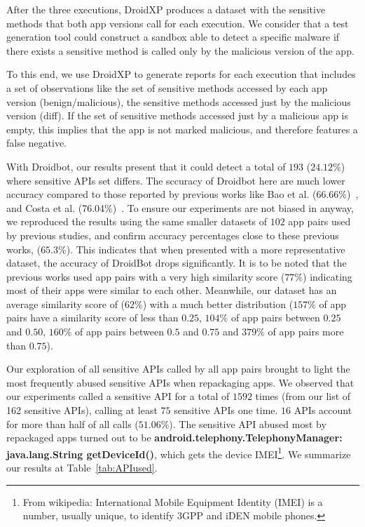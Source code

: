 After the three executions, DroidXP produces a dataset with the sensitive methods that both app versions call for each execution. We consider that a test generation tool could construct a sandbox able to detect a specific malware if there exists a sensitive method is called only by the malicious version of the app. 

To this end, we use DroidXP to generate reports for each execution that includes a set of observations like the set of sensitive methods accessed by each app version (benign/malicious), the sensitive methods accessed just by the malicious version (diff). If the set of sensitive methods accessed just by a malicious app is empty, this implies that the app is not marked malicious, and therefore features a false negative.

With Droidbot, our results present that it could detect a total of $193$ ($24.12$\%) where sensitive APIs set differs. The sccuracy of Droidbot here are much lower accuracy compared to those reported by previous works like Bao et al. (66.66\%)~\cite{DBLP:conf/wcre/BaoLL18}, and Costa et al. (76.04\%)~\cite{DBLP:journals/jss/CostaMMSSBNR22}. To ensure our experiments are not biased in anyway, we reproduced the results using the same smaller datasets of $102$ app pairs used by previous studies, and confirm accuracy percentages close to these previous works, ($65.3$\%). This indicates that when presented with a more representative dataset, the accuracy of DroidBot drops significantly. It is to be noted that the previous works used app pairs with a very high similarity score ($77\%$) indicating most of their apps were similar to each other. Meanwhile, our dataset has an average similarity score of ($62\%$) with a much better distribution ($157\%$ of app pairs have a similarity score of less than $0.25$, $104\%$ of app pairs between $0.25$ and $0.50$, $160\%$ of app pairs between $0.5$ and $0.75$  and $379\%$ of app pairs more than $0.75$). 

Our exploration of all sensitive APIs called by all app pairs brought to light the most frequently abused sensitive APIs when repackaging apps. We observed that our experiments called a sensitive API for a total of $1592$ times (from our list of 162 sensitive APIs), calling at least $75$ sensitive APIs one time. $16$ APIs account for more than half of all calls ($51.06$\%). The sensitive API abused most by repackaged apps turned out to be \textbf{android.telephony.TelephonyManager: java.lang.String getDeviceId()}, which gets the device IMEI\footnote{From wikipedia: International Mobile Equipment Identity (IMEI) is a number, usually unique, to identify 3GPP and iDEN mobile phones.}. We summarize our results at Table~\ref{tab:APIused}. 

